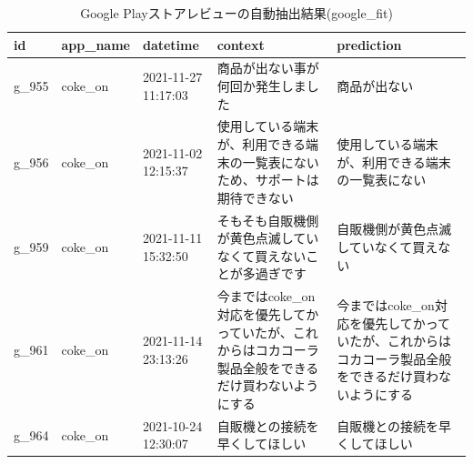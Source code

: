 \begin{table}[htbp]
  \caption{Google Playストアレビューの自動抽出結果(google\_fit)}
  \label{tb:googleqa}
  \small
  \begin{center}
  \begin{tabularx}{\linewidth}{|l|l|X|X|X|}
    \hline
    id&app\_name&datetime&context&prediction\\\hline\hline
    g\_955&coke\_on&2021-11-27 11:17:03&商品が出ない事が何回か発生しました&商品が出ない\\\hline
    g\_956&coke\_on&2021-11-02 12:15:37&使用している端末が、利用できる端末の一覧表にないため、サポートは期待できない&使用している端末が、利用できる端末の一覧表にない\\\hline
    g\_959&coke\_on&2021-11-11 15:32:50&そもそも自販機側が黄色点滅していなくて買えないことが多過ぎです&自販機側が黄色点滅していなくて買えない\\\hline
    g\_961&coke\_on&2021-11-14 23:13:26&今まではcoke\_on対応を優先してかっていたが、これからはコカコーラ製品全般をできるだけ買わないようにする&今まではcoke\_on対応を優先してかっていたが、これからはコカコーラ製品全般をできるだけ買わないようにする\\\hline
    g\_964&coke\_on&2021-10-24 12:30:07&自販機との接続を早くしてほしい&自販機との接続を早くしてほしい\\\hline
  \end{tabularx}\end{center}
\end{table}

